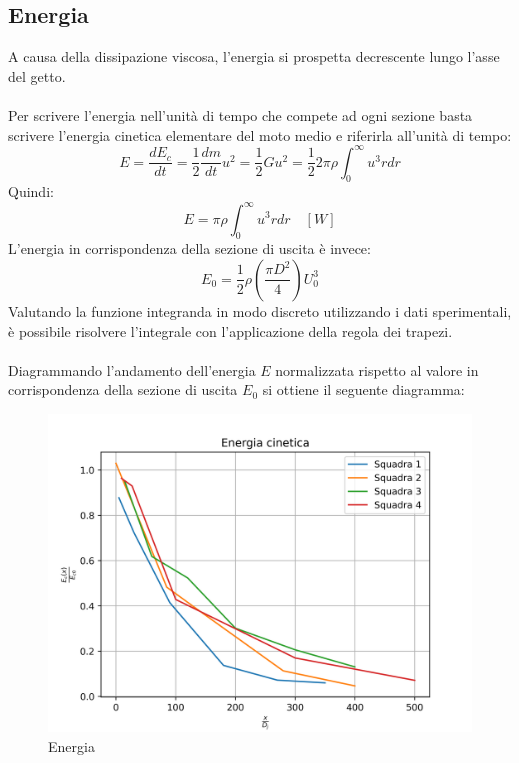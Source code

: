 \subsection{Energia}
A causa della dissipazione viscosa, l'energia si prospetta decrescente lungo l'asse del getto.\\\\
Per scrivere l'energia nell'unità di tempo che compete ad ogni sezione basta scrivere l'energia cinetica elementare del moto medio e riferirla all'unità di tempo:
\begin{equation*}
    E = \frac{dE_c}{dt} = \frac12 \frac{dm}{dt} u^2 = \frac12 G u^2 = \frac12 2\pi\rho \int_0^\infty u^3r dr
\end{equation*}
Quindi:
\begin{equation*}
    E = \pi\rho \int_0^\infty u^3r dr \quad \left[W\right]
\end{equation*}
L'energia in corrispondenza della sezione di uscita è invece:
\begin{equation*}
    E_0 = \frac12 \rho \left( \frac{\pi D^2}4 \right) U_0^3
\end{equation*}
Valutando la funzione integranda in modo discreto utilizzando i dati sperimentali, è possibile risolvere l'integrale con l'applicazione della regola dei trapezi.\\\\
Diagrammando l'andamento dell'energia $E$ normalizzata rispetto al valore in corrispondenza della sezione di uscita $E_0$ si ottiene il seguente diagramma:
\begin{figure}[h]
    \centering
    \includegraphics[width=.8\linewidth]{images/4/energia.png}
    \caption{Energia}
\end{figure}
